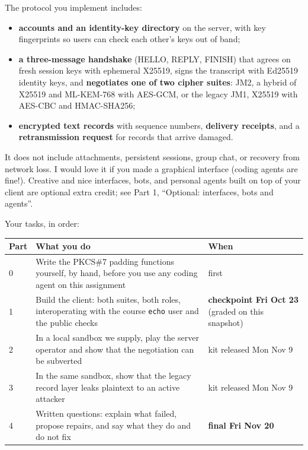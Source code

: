 \documentclass[11pt]{article}
\begin{document}
The protocol you implement includes:

\begin{itemize}
\item \textbf{accounts and an identity-key directory} on the server, with key fingerprints so users can check each other's keys out of band;
\item \textbf{a three-message handshake} (HELLO, REPLY, FINISH) that agrees on fresh session keys with ephemeral X25519, signs the transcript with Ed25519 identity keys, and \textbf{negotiates one of two cipher suites}: JM2, a hybrid of X25519 and ML-KEM-768 with AES-GCM, or the legacy JM1, X25519 with AES-CBC and HMAC-SHA256;
\item \textbf{encrypted text records} with sequence numbers, \textbf{delivery receipts}, and a \textbf{retransmission request} for records that arrive damaged.
\end{itemize}
It does not include attachments, persistent sessions, group chat, or recovery from network loss. I would love it if you made a graphical interface (coding agents are fine!). Creative and nice interfaces, bots, and personal agents built on top of your client are optional extra credit; see Part 1, ``Optional: interfaces, bots and agents''.

Your tasks, in order:

\begin{center}\small
\begin{tabular}{p{0.56in}p{2.40in}p{2.04in}}
\toprule
\textbf{Part} & \textbf{What you do} & \textbf{When} \\
\midrule
0 & Write the PKCS\#7 padding functions yourself, by hand, before you use any coding agent on this assignment & first \\
1 & Build the client: both suites, both roles, interoperating with the course \texttt{echo} user and the public checks & \textbf{checkpoint Fri Oct 23} (graded on this snapshot) \\
2 & In a local sandbox we supply, play the server operator and show that the negotiation can be subverted & kit released Mon Nov 9 \\
3 & In the same sandbox, show that the legacy record layer leaks plaintext to an active attacker & kit released Mon Nov 9 \\
4 & Written questions: explain what failed, propose repairs, and say what they do and do not fix & \textbf{final Fri Nov 20} \\
\bottomrule
\end{tabular}
\end{center}
\end{document}
